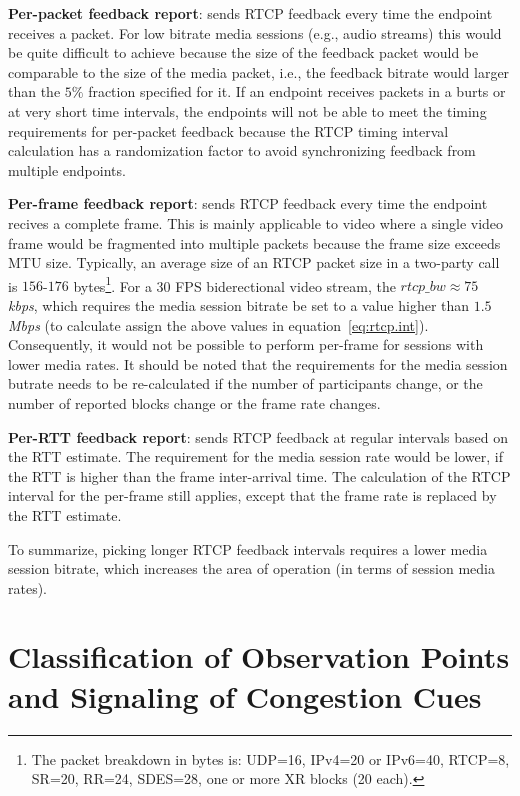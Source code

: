 \textbf{Per-packet feedback report}: sends RTCP feedback every time the
endpoint receives a packet. For low bitrate media sessions (e.g., audio
streams) this would be quite difficult to achieve because the size of the
feedback packet would be comparable to the size of the media packet, i.e., the
feedback bitrate would larger than the $5\%$ fraction specified for it. If an
endpoint receives packets in a burts or at very short time intervals, the
endpoints will not be able to meet the timing requirements for per-packet
feedback because the RTCP timing interval calculation has a randomization
factor to avoid synchronizing feedback from multiple endpoints.

\textbf{Per-frame feedback report}: sends RTCP feedback every time the
endpoint recives a complete frame. This is mainly applicable to video where a
single video frame would be fragmented into multiple packets because the frame
size exceeds MTU size. Typically, an average size of an RTCP packet size in a
two-party call is $156$-$176$ bytes\footnote{The packet breakdown in bytes is:
UDP=16, IPv4=20 or IPv6=40, RTCP=8, SR=20, RR=24, SDES=28, one or more XR
blocks (20 each).}. For a 30 FPS biderectional video stream, the $rtcp\_bw
\approx 75$ \emph{kbps}, which requires the media session bitrate be set to a
value higher than $1.5$ \emph{Mbps} (to calculate assign the above values in
equation~\ref{eq:rtcp.int}). Consequently, it would not be possible to perform
per-frame for sessions with lower media rates. It should be noted that the
requirements for the media session butrate needs to be re-calculated if the
number of participants change, or the number of reported blocks change or the
frame rate changes.

\textbf{Per-RTT feedback report}: sends RTCP feedback at regular intervals
based on the RTT estimate. The requirement for the media session rate would be
lower, if the RTT is higher than the frame inter-arrival time. The calculation
of the RTCP interval for the per-frame still applies, except that the frame
rate is replaced by the RTT estimate.

To summarize, picking longer RTCP feedback intervals requires a lower media
session bitrate, which increases the area of operation (in terms of session
media rates).

\section{Classification of Observation Points and Signaling of Congestion Cues}
\label{fw.fw}

